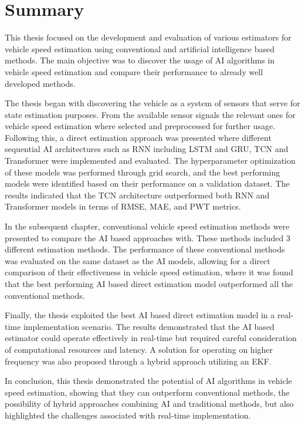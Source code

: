 \chapter{Summary}

This thesis focused on the development and evaluation of various estimators for vehicle speed estimation using conventional and artificial intelligence based methods. The main objective was to discover the usage of AI algorithms in vehicle speed estimation and compare their performance to already well developed methods. 

The thesis began with discovering the vehicle as a system of sensors that serve for state estimation purposes. From the available sensor signals the relevant ones for vehicle speed estimation where selected and preprocessed for further usage. Following this, a direct estimation approach was presented where different sequential AI architectures such as RNN including LSTM and GRU, TCN and Transformer were implemented and evaluated. The hyperparameter optimization of these models was performed through grid search, and the best performing models were identified based on their performance on a validation dataset. The results indicated that the TCN architecture outperformed both RNN and Transformer models in terms of RMSE, MAE, and PWT metrics.

In the subsequent chapter, conventional vehicle speed estimation methods were presented to compare the AI based approaches with. These methods included 3 different estimation methods. The performance of these conventional methods was evaluated on the same dataset as the AI models, allowing for a direct comparison of their effectiveness in vehicle speed estimation, where it was found that the best performing AI based direct estimation model outperformed all the conventional methods.

Finally, the thesis exploited the best AI based direct estimation model in a real-time implementation scenario. The results demonstrated that the AI based estimator could operate effectively in real-time but required careful consideration of computational resources and latency. A solution for operating on higher frequency was also proposed through a hybrid approach utilizing an EKF.

In conclusion, this thesis demonstrated the potential of AI algorithms in vehicle speed estimation, showing that they can outperform conventional methods, the possibility of hybrid approaches combining AI and traditional methods, but also highlighted the challenges associated with real-time implementation.